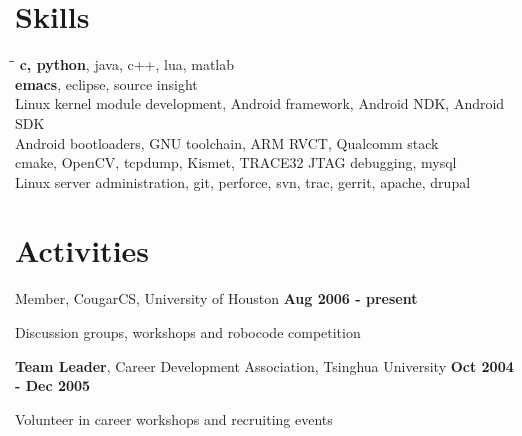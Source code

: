 \documentclass[overlapped, line]{resume}
\begin{document}
\begin{resume}

         \vspace{-15pt}\section{Skills} 
         \begin{tabbing}
           \= \hspace{1.5in}\= \kill
            \>\textbf{c, python}, java, c++, lua, matlab\\
            \>\textbf{emacs}, eclipse, source insight\\
            \>Linux kernel module development, Android framework, Android NDK, Android SDK\\
           \> \>Android bootloaders, GNU toolchain, ARM RVCT, Qualcomm stack\\ 
           \> \>cmake, OpenCV, tcpdump, Kismet, TRACE32 JTAG debugging, mysql\\
            \> Linux server administration, git, perforce, svn, trac, gerrit, apache, drupal

         \end{tabbing}

         \vspace{-15pt}\section{Activities}
         Member, CougarCS, University of Houston  \hfill {\bf Aug 2006 - present}\\
         \vspace{-10pt}      %
         \begin{list2}
         \item Discussion groups, workshops and robocode competition
         \end{list2}  \vspace{-5pt}

         {\bf Team Leader}, Career Development Association, Tsinghua University \hfill {\bf Oct 2004 -  Dec 2005}\\
         \vspace{-10pt}      %
         \begin{list2}
         \item Volunteer in career workshops and recruiting events
         \end{list2}  \vspace{-5pt}


\end{resume}
\end{document}
